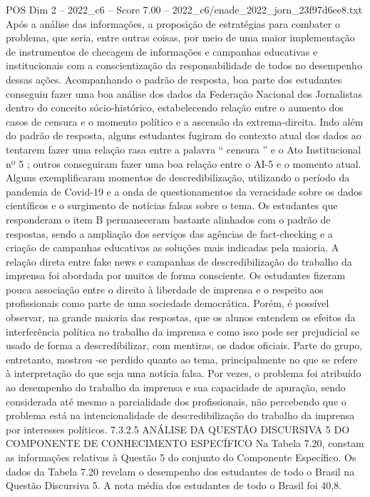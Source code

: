 \begin{textsample}{POS Dim 2 – 2022\_c6 – Score 7.00 – 2022\_c6/enade\_2022\_jorn\_23f97d6ee8.txt}
Após a análise das informações, a proposição de estratégias para combater o problema, que seria, entre outras coisas, por meio de uma maior implementação de instrumentos de checagem de informações e campanhas educativas e institucionais com a conscientização da responsabilidade de todos no desempenho dessas ações.
Acompanhando o padrão de resposta, boa parte dos estudantes conseguiu fazer uma boa análise dos dados da Federação Nacional dos Jornalistas dentro do conceito sócio-histórico, estabelecendo relação entre o aumento dos casos de censura e o momento político e a ascensão da extrema-direita.
Indo além do padrão de resposta, alguns estudantes fugiram do contexto atual dos dados ao tentarem fazer uma relação rasa entre a palavra “ censura ” e o Ato Institucional nº 5 ; outros conseguiram fazer uma boa relação entre o AI-5 e o momento atual.
Alguns exemplificaram momentos de descredibilização, utilizando o período da pandemia de Covid-19 e a onda de questionamentos da veracidade sobre os dados científicos e o surgimento de notícias falsas sobre o tema.
Os estudantes que responderam o item B permaneceram bastante alinhados com o padrão de respostas, sendo a ampliação dos serviços das agências de fact-checking e a criação de campanhas educativas as soluções mais indicadas pela maioria.
A relação direta entre fake news e campanhas de descredibilização do trabalho da imprensa foi abordada por muitos de forma consciente.
Os estudantes fizeram pouca associação entre o direito à liberdade de imprensa e o respeito aos profissionais como parte de uma sociedade democrática.
Porém, é possível observar, na grande maioria das respostas, que os alunos entendem os efeitos da interferência política no trabalho da imprensa e como isso pode ser prejudicial se usado de forma a descredibilizar, com mentiras, os dados oficiais.
Parte do grupo, entretanto, mostrou -se perdido quanto ao tema, principalmente no que se refere à interpretação do que seja uma notícia falsa.
Por vezes, o problema foi atribuído ao desempenho do trabalho da imprensa e sua capacidade de apuração, sendo considerada até mesmo a parcialidade dos profissionais, não percebendo que o problema está na intencionalidade de descredibilização do trabalho da imprensa por interesses políticos. 7.3.2.5 ANÁLISE DA QUESTÃO DISCURSIVA 5 DO COMPONENTE DE CONHECIMENTO ESPECÍFICO Na Tabela 7.20, constam as informações relativas à Questão 5 do conjunto do Componente Específico.
Os dados da Tabela 7.20 revelam o desempenho dos estudantes de todo o Brasil na Questão Discursiva 5.
A nota média dos estudantes de todo o Brasil foi 40,8.

\end{textsample}
